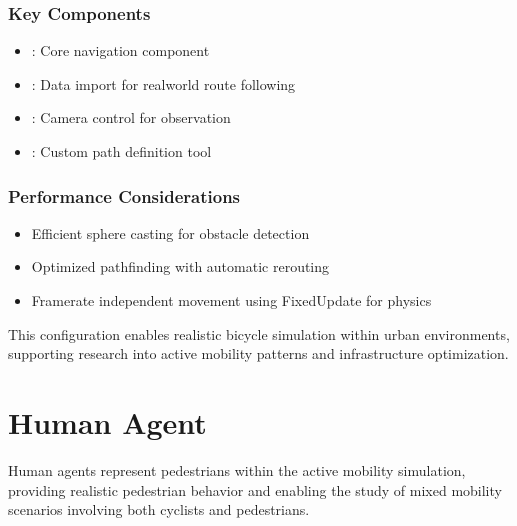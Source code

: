 \documentclass[letterpaper,10pt,english]{jupyterBook}
\begin{document}
\subsubsection{Key Components}
\label{\detokenize{Bicycle Agent:key-components}}\begin{itemize}
\item {} 
\sphinxAtStartPar
{}: Core navigation component

\item {} 
\sphinxAtStartPar
{}: Data import for real\sphinxhyphen{}world route following

\item {} 
\sphinxAtStartPar
{}: Camera control for observation

\item {} 
\sphinxAtStartPar
{}: Custom path definition tool

\end{itemize}


\subsubsection{Performance Considerations}
\label{\detokenize{Bicycle Agent:performance-considerations}}\begin{itemize}
\item {} 
\sphinxAtStartPar
Efficient sphere casting for obstacle detection

\item {} 
\sphinxAtStartPar
Optimized pathfinding with automatic rerouting

\item {} 
\sphinxAtStartPar
Frame\sphinxhyphen{}rate independent movement using FixedUpdate for physics

\end{itemize}

\sphinxAtStartPar
This configuration enables realistic bicycle simulation within urban environments, supporting research into active mobility patterns and infrastructure optimization.

\sphinxstepscope


\section{Human Agent}
\label{\detokenize{Human Agent:human-agent}}\label{\detokenize{Human Agent::doc}}
\sphinxAtStartPar
Human agents represent pedestrians within the active mobility simulation, providing realistic pedestrian behavior and enabling the study of mixed mobility scenarios involving both cyclists and pedestrians.
\end{document}
